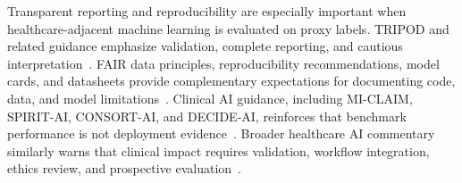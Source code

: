 Transparent reporting and reproducibility are especially important when healthcare-adjacent machine learning is evaluated on proxy labels. TRIPOD and related guidance emphasize validation, complete reporting, and cautious interpretation~\cite{collins2015tripod,moons2015tripod,luo2016mlguidelines}. FAIR data principles, reproducibility recommendations, model cards, and datasheets provide complementary expectations for documenting code, data, and model limitations~\cite{wilkinson2016fair,pineau2021reproducibility,mitchell2019modelcards,gebru2021datasheets}. Clinical AI guidance, including MI-CLAIM, SPIRIT-AI, CONSORT-AI, and DECIDE-AI, reinforces that benchmark performance is not deployment evidence~\cite{norgeot2020miclaim,rivera2020spiritai,liu2020consortai,vasey2022decideai}. Broader healthcare AI commentary similarly warns that clinical impact requires validation, workflow integration, ethics review, and prospective evaluation~\cite{rajkomar2019medicine,kelly2019challenges,chen2017prediction,wiens2019roadmap,char2018ethical,nagendran2020clinicians}.
